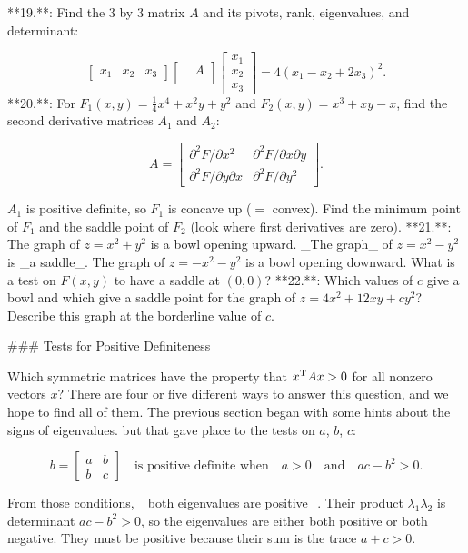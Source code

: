 

**19.**: Find the 3 by 3 matrix \(A\) and its pivots, rank, eigenvalues, and determinant:

\[\begin{bmatrix}x_{1}&x_{2}&x_{3}\end{bmatrix}\begin{bmatrix}&A\\ &\end{bmatrix}\begin{bmatrix}x_{1}\\ x_{2}\\ x_{3}\end{bmatrix}=4(x_{1}-x_{2}+2x_{3})^{2}.\]
**20.**: For \(F_{1}(x,y)=\frac{1}{4}x^{4}+x^{2}y+y^{2}\) and \(F_{2}(x,y)=x^{3}+xy-x\), find the second derivative matrices \(A_{1}\) and \(A_{2}\):

\[A=\begin{bmatrix}\partial^{2}F/\partial x^{2}&\partial^{2}F/\partial x \partial y\\ \partial^{2}F/\partial y\partial x&\partial^{2}F/\partial y^{2}\end{bmatrix}.\]

\(A_{1}\) is positive definite, so \(F_{1}\) is concave up (\(=\) convex). Find the minimum point of \(F_{1}\) and the saddle point of \(F_{2}\) (look where first derivatives are zero).
**21.**: The graph of \(z=x^{2}+y^{2}\) is a bowl opening upward. _The graph_ of \(z=x^{2}-y^{2}\) is _a saddle_. The graph of \(z=-x^{2}-y^{2}\) is a bowl opening downward. What is a test on \(F(x,y)\) to have a saddle at \((0,0)\)?
**22.**: Which values of \(c\) give a bowl and which give a saddle point for the graph of \(z=4x^{2}+12xy+cy^{2}\)? Describe this graph at the borderline value of \(c\).

### Tests for Positive Definiteness

Which symmetric matrices have the property that \(x^{\rm T}Ax>0\) for all nonzero vectors \(x\)? There are four or five different ways to answer this question, and we hope to find all of them. The previous section began with some hints about the signs of eigenvalues. but that gave place to the tests on \(a\), \(b\), \(c\):

\[b=\begin{bmatrix}a&b\\ b&c\end{bmatrix}\quad\text{is positive definite when}\quad a>0\quad\text{and} \quad ac-b^{2}>0.\]

From those conditions, _both eigenvalues are positive_. Their product \(\lambda_{1}\lambda_{2}\) is determinant \(ac-b^{2}>0\), so the eigenvalues are either both positive or both negative. They must be positive because their sum is the trace \(a+c>0\).

